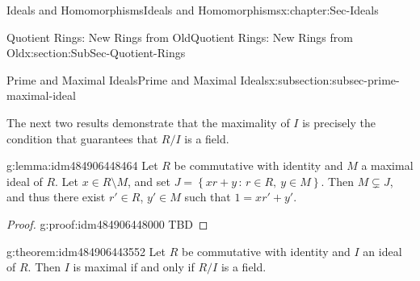 \documentclass[oneside,10pt,]{book}
\numberwithin{equation}{section}
\newcommand{\setof}[2]{{\left\{#1\,\colon\,#2\right\}}}
\begin{document}
\begin{chapterptx}{Ideals and Homomorphisms}{}{Ideals and Homomorphisms}{}{}{x:chapter:Sec-Ideals}
\begin{sectionptx}{Quotient Rings: New Rings from Old}{}{Quotient Rings: New Rings from Old}{}{}{x:section:SubSec-Quotient-Rings}
\begin{subsectionptx}{Prime and Maximal Ideals}{}{Prime and Maximal Ideals}{}{}{x:subsection:subsec-prime-maximal-ideal}
\par
The next two results demonstrate that the maximality of \(I\) is precisely the condition that guarantees that \(R/I\) is a field.%
\begin{lemma}{}{}{g:lemma:idm484906448464}%
Let \(R\) be commutative with identity and \(M\) a maximal ideal of \(R\). Let \(x\in R\setminus M\), and set \(J = \setof{xr+y}{r\in R, \ y\in M}\). Then \(M\subsetneq J\), and thus there exist \(r'\in R\), \(y'\in M\) such that \(1 = xr'+y'\).%
\end{lemma}
\begin{proof}{}{g:proof:idm484906448000}
TBD\end{proof}
\begin{theorem}{}{}{g:theorem:idm484906443552}%
Let \(R\) be commutative with identity and \(I\) an ideal of \(R\). Then \(I\) is maximal if and only if \(R/I\) is a field.%


\end{theorem}
\end{subsectionptx}
\end{sectionptx}
\end{chapterptx}
\end{document}
